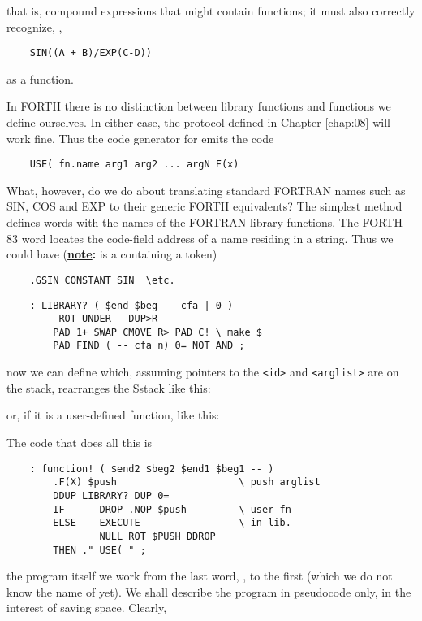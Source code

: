 \begin{dd}
that is, compound expressions that might contain functions; it must also correctly recognize, \eg,

\begin{lstlisting}
    SIN((A + B)/EXP(C-D))
\end{lstlisting}

as a function.

In FORTH there is no distinction between library functions and functions we define ourselves. In either case, the protocol defined in Chapter \ref{chap:08} will work fine. Thus the code generator for  emits the code

\begin{lstlisting}
    USE( fn.name arg1 arg2 ... argN F(x)
\end{lstlisting}

What, however, do we do about translating standard FORTRAN names such as SIN, COS and EXP to their generic FORTH equivalents? The simplest method defines words with the names of the FORTRAN library functions. The FORTH-83 word  locates the code-field address of a name residing in a string. Thus we could have (\textbf{\underline{note}:}  is a  containing a token)

\begin{lstlisting}
    .GSIN CONSTANT SIN  \etc.
\end{lstlisting}

\begin{lstlisting}
    : LIBRARY? ( $end $beg -- cfa | 0 )
        -ROT UNDER - DUP>R
        PAD 1+ SWAP CMOVE R> PAD C! \ make $
        PAD FIND ( -- cfa n) 0= NOT AND ;
\end{lstlisting}

now we can define  which, assuming pointers to the \texttt{<id>} and \texttt{<arglist>} are on the stack, rearranges the Sstack like this:

or, if it is a user-defined function, like this:

The code that does all this is

\begin{lstlisting}
    : function! ( $end2 $beg2 $end1 $beg1 -- )
        .F(X) $push                     \ push arglist
        DDUP LIBRARY? DUP 0=
        IF      DROP .NOP $push         \ user fn
        ELSE    EXECUTE                 \ in lib.
                NULL ROT $PUSH DDROP
        THEN ." USE( " ;
\end{lstlisting}

 the program itself we work from the last word, , to the first (which we do not know the name of yet). We shall describe the program in pseudocode only, in the interest of saving space. Clearly,


\end{dd}
